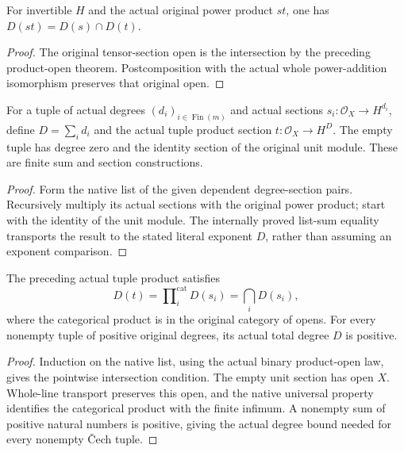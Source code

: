 \begin{lemma}
\label{lem:proj-affine-power-product-open}
\leanok
For invertible $H$ and the actual original power product $st$,
one has $D(st)=D(s)\cap D(t)$.
\end{lemma}
\begin{proof}
The original tensor-section open is the intersection by the preceding
product-open theorem. Postcomposition with the actual whole
power-addition isomorphism preserves that original open.
\end{proof}

\begin{definition}
\label{def:proj-affine-finite-power-products}
\leanok
For a tuple of actual degrees $(d_i)_{i\in\operatorname{Fin}(m)}$
and actual sections $s_i:\mathcal O_X\to H^{d_i}$, define
$D=\sum_i d_i$ and the actual tuple product section
$t:\mathcal O_X\to H^D$. The empty tuple has degree zero and the
identity section of the original unit module.
These are finite sum and section constructions.
\end{definition}
\begin{proof}
Form the native list of the given dependent degree-section pairs.
Recursively multiply its actual sections with the original power
product; start with the identity of the unit module. The internally
proved list-sum equality transports the result to the stated literal
exponent $D$, rather than assuming an exponent comparison.
\end{proof}

\begin{lemma}
\label{lem:proj-affine-finite-product-opens}
\leanok
The preceding actual tuple product satisfies
\[
 D(t)=\prod\nolimits_i^{\mathrm{cat}} D(s_i)
     =\bigcap_iD(s_i),
\]
where the categorical product is in the original category of opens.
For every nonempty tuple of positive original degrees, its actual
total degree $D$ is positive.
\end{lemma}
\begin{proof}
Induction on the native list, using the actual binary product-open
law, gives the pointwise intersection condition. The empty unit
section has open $X$. Whole-line transport preserves this open, and
the native universal property identifies the categorical product
with the finite infimum. A nonempty sum of positive natural numbers
is positive, giving the actual degree bound needed for every
nonempty \v{C}ech tuple.
\end{proof}

